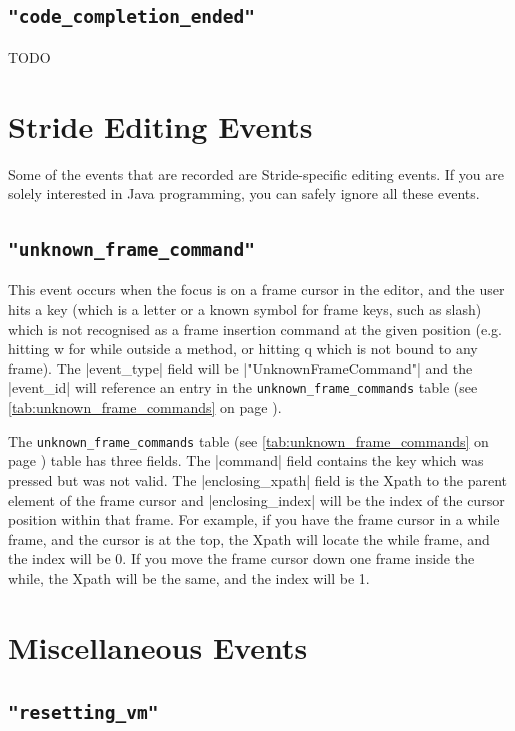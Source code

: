\documentclass{report}
\newcommand{\myref}[1]{\autoref{#1} on page \pageref*{#1}}
\newcommand{\tabref}[1]{\lstinline|#1| table (see \myref{tab:#1})}
\begin{document}
\subsection{\lstinline!"code_completion_ended"!} TODO

\section{Stride Editing Events}

Some of the events that are recorded are Stride-specific editing events.  If you are solely interested
in Java programming, you can safely ignore all these events.

\subsection{\lstinline!"unknown_frame_command"!}

This event occurs when the focus is on a frame cursor in the editor, and the user hits a key
(which is a letter or a known symbol for frame keys, such as slash) which is not recognised as a
frame insertion command at the given position (e.g. hitting w for while outside a method, or
hitting q which is not bound to any frame).  The |event_type| field will be |"UnknownFrameCommand"|
and the |event_id| will reference an entry in the \tabref{unknown_frame_commands}.


The \tabref{unknown_frame_commands} table has three fields.  The |command| field contains the key which
was pressed but was not valid.  The |enclosing_xpath| field is the Xpath to the parent element of the
 frame cursor and |enclosing_index| will be the index of the cursor position within that frame.  For
 example, if you have the frame cursor in a while frame, and the cursor is at the top, the Xpath
 will locate the while frame, and the index will be 0.  If you move the frame cursor down one
 frame inside the while, the Xpath will be the same, and the index will be 1.

\section{Miscellaneous Events}

\subsection{\lstinline!"resetting_vm"!}
\end{document}
